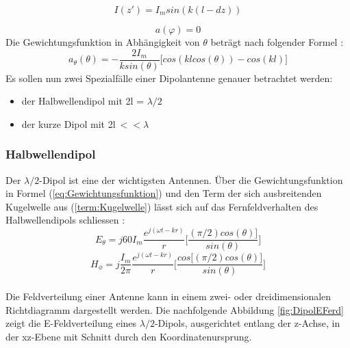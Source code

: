 \begin{equation}
I(z')=I_{m}sin(k(l-dz))
\end{equation}

\begin{equation}
a(\varphi)= 0
\end{equation}
Die Gewichtungsfunktion in Abhängigkeit von $\theta$ beträgt nach folgender Formel \cite{elliott1981antenna}:
\begin{equation}\label{eq:Gewichtungsfunktion}
a_{\theta}(\theta)=- \frac{2I_{m}}{k sin(\theta)} \Big\lbrack cos(kl cos(\theta)) - cos(kl) \Big\rbrack
\end{equation}
Es sollen nun zwei Spezialfälle einer Dipolantenne genauer betrachtet werden:
\begin{itemize}
\item der Halbwellendipol mit 2l = $\lambda/2$
\item der kurze Dipol mit 2l$ \ <<\lambda$
\end{itemize}
\newpage
\subsubsection{Halbwellendipol}
Der $\lambda/2$-Dipol ist eine der wichtigsten Antennen. Über die Gewichtungsfunktion in Formel (\ref{eq:Gewichtungsfunktion}) und den Term der sich ausbreitenden Kugelwelle aus (\ref{term:Kugelwelle}) lässt sich auf das Fernfeldverhalten des Halbwellendipols schliessen \cite{elliott1981antenna}:\\
\begin{equation}
E_{\theta}=j60I_{m} \frac{e^{j(\omega t - kr)}}{r} \biggl\lbrack \frac{  (\pi/2) cos(\theta)\rbrack}{sin(\theta)} \biggr\rbrack
\end{equation}
\begin{equation}
H_{\phi}=j \frac{I_{m}}{2\pi} \frac{e^{j(\omega t - kr)}}{r} \biggl\lbrack \frac{cos\lbrack  (\pi/2) cos(\theta)\rbrack}{sin(\theta)} \biggr\rbrack
\end{equation}\\
Die Feldverteilung einer Antenne kann in einem zwei- oder dreidimensionalen Richtdiagramm dargestellt werden. Die nachfolgende Abbildung \ref{fig:DipolEFerd} zeigt die E-Feldverteilung eines $\lambda/2$-Dipols, ausgerichtet entlang der z-Achse, in der xz-Ebene mit Schnitt durch den Koordinatenursprung.\\



